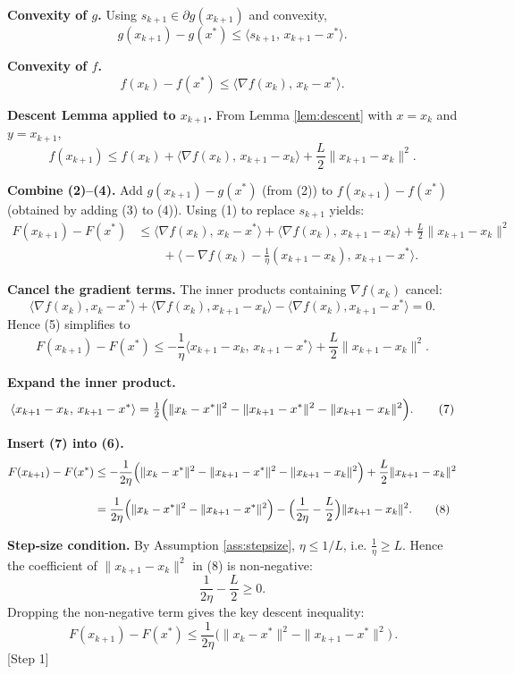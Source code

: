 \documentclass{article}
\begin{document}
\begin{enumerate}
\noindent\textbf{Convexity of $g$.}
Using $s_{k+1}\in\partial g(x_{k+1})$ and convexity,
\[
g(x_{k+1})-g(x^{*})\le\langle s_{k+1},\,x_{k+1}-x^{*}\rangle . \tag{2}
\]

\noindent\textbf{Convexity of $f$.}
\[
f(x_{k})-f(x^{*})\le\langle\nabla f(x_{k}),\,x_{k}-x^{*}\rangle . \tag{3}
\]

\noindent\textbf{Descent Lemma applied to $x_{k+1}$.}
From Lemma \ref{lem:descent} with $x=x_{k}$ and $y=x_{k+1}$,
\[
f(x_{k+1})\le f(x_{k})+\langle\nabla f(x_{k}),\,x_{k+1}-x_{k}\rangle
+\frac{L}{2}\|x_{k+1}-x_{k}\|^{2}. \tag{4}
\]

\noindent\textbf{Combine (2)–(4).}
Add $g(x_{k+1})-g(x^{*})$ (from (2)) to $f(x_{k+1})-f(x^{*})$ (obtained by adding (3) to (4)).  Using (1) to replace $s_{k+1}$ yields:
\[
\begin{aligned}
F(x_{k+1})-F(x^{*})
&\le \langle\nabla f(x_{k}),\,x_{k}-x^{*}\rangle
      +\langle\nabla f(x_{k}),\,x_{k+1}-x_{k}\rangle
      +\frac{L}{2}\|x_{k+1}-x_{k}\|^{2}\\
&\qquad +\Big\langle -\nabla f(x_{k})-\frac{1}{\eta}(x_{k+1}-x_{k}),\,x_{k+1}-x^{*}\Big\rangle .
\end{aligned}
\tag{5}
\]

\noindent\textbf{Cancel the gradient terms.}  
The inner products containing $\nabla f(x_{k})$ cancel:
\[
\langle\nabla f(x_{k}),x_{k}-x^{*}\rangle
+\langle\nabla f(x_{k}),x_{k+1}-x_{k}\rangle
-\langle\nabla f(x_{k}),x_{k+1}-x^{*}\rangle =0 .
\]
Hence (5) simplifies to
\[
F(x_{k+1})-F(x^{*})
\le -\frac{1}{\eta}\langle x_{k+1}-x_{k},\,x_{k+1}-x^{*}\rangle
+\frac{L}{2}\|x_{k+1}-x_{k}\|^{2}. \tag{6}
\]

\noindent\textbf{Expand the inner product.}  
\[
\langle x_{k+1}-x_{k},\,x_{k+1}-x^{*}\rangle
= \tfrac12\Bigl(\|x_{k}-x^{*}\|^{2}-\|x_{k+1}-x^{*}\|^{2}
               -\|x_{k+1}-x_{k}\|^{2}\Bigr). \tag{7}
\]

\noindent\textbf{Insert (7) into (6).}  
\[
\begin{aligned}
F(x_{k+1})-F(x^{*})
&\le -\frac{1}{2\eta}\Bigl(\|x_{k}-x^{*}\|^{2}
      -\|x_{k+1}-x^{*}\|^{2}
      -\|x_{k+1}-x_{k}\|^{2}\Bigr)
   +\frac{L}{2}\|x_{k+1}-x_{k}\|^{2}\\[2mm]
&= \frac{1}{2\eta}\Bigl(\|x_{k}-x^{*}\|^{2}
      -\|x_{k+1}-x^{*}\|^{2}\Bigr)
   -\Bigl(\frac{1}{2\eta}-\frac{L}{2}\Bigr)\|x_{k+1}-x_{k}\|^{2}. \tag{8}
\end{aligned}
\]

\noindent\textbf{Step‑size condition.}  
By Assumption \ref{ass:stepsize}, $\eta\le 1/L$, i.e. $\frac{1}{\eta}\ge L$. Hence the coefficient of $\|x_{k+1}-x_{k}\|^{2}$ in (8) is non‑negative:
\[
\frac{1}{2\eta}-\frac{L}{2}\ge 0 .
\]
Dropping the non‑negative term gives the key descent inequality:
\[
\boxed{\,F(x_{k+1})-F(x^{*})\le
\frac{1}{2\eta}\bigl(\|x_{k}-x^{*}\|^{2}
-\|x_{k+1}-x^{*}\|^{2}\bigr)\,}. \tag{9}
\]
[Step 1]


\end{enumerate}
\end{document}
